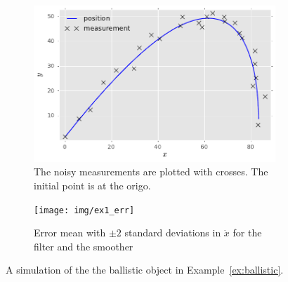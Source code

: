 \begin{figure}[htb]%
    \centering%
    \begin{subfigure}[b]{0.5\textwidth}%
    	\centering%
    	\includegraphics[width=\textwidth]{img/ex1_pos_meas}%
    	\caption{The noisy measurements are plotted with crosses. The initial point is at the origo.}%
		\label{fig:ballistic_flight}%
    \end{subfigure}%
    \begin{subfigure}[b]{0.5\textwidth}%
    	\centering%
		\texttt{[image: img/ex1\_err]}%
    	\caption{Error mean with $\pm 2$ standard deviations in $\dot{x}$ for the filter and the smoother}%
		\label{fig:ballistic_err}%
    \end{subfigure}%
	\caption{A simulation of the the ballistic object in 
	Example~\ref{ex:ballistic}.}
	\label{fig:ballistic}
 \end{figure}




